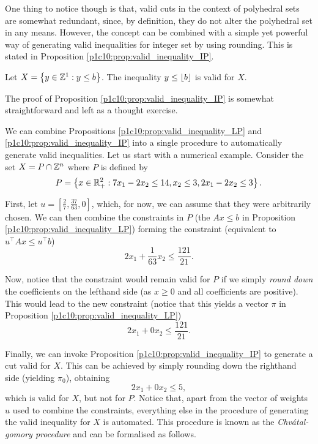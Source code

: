 One thing to notice though is that, valid cuts in the context of polyhedral sets are somewhat redundant, since, by definition, they do not alter the polyhedral set in any means. However, the concept can be combined with a simple yet powerful way of generating valid inequalities for integer set by using rounding. This is stated in Proposition \ref{p1c10:prop:valid_inequality_IP}. 
%
\begin{proposition} \label{p1c10:prop:valid_inequality_IP}
	Let $X = \left\{ y \in \mathbb{Z}^1 : y \leq b \right \}$. The inequality $y \leq \lfloor b \rfloor$ is valid for $X$.
\end{proposition}
%
The proof of Proposition \ref{p1c10:prop:valid_inequality_IP} is somewhat straightforward and left as a thought exercise. 

We can combine Propositions \ref{p1c10:prop:valid_inequality_LP} and \ref{p1c10:prop:valid_inequality_IP} into a single procedure to automatically generate valid inequalities. Let us start with a numerical example. Consider the set $X = P \cap \mathbb{Z}^n$ where $P$ is defined by
	\begin{equation*}
		P = \left\{ x \in \mathbb{R}^2_+ : 7x_1 -2x_2 \leq 14, x_2 \leq 3, 2x_1 - 2x_2 \leq 3 \right \}.
	\end{equation*}
	
First, let $u=\left[\frac{2}{7}, \frac{37}{63}, 0\right]$, which, for now, we can assume that they were arbitrarily chosen. We can then combine the constraints in $P$ (the $Ax \le b$ in Proposition \ref{p1c10:prop:valid_inequality_LP}) forming the constraint (equivalent to $u^\top Ax \le u^\top b$)
	\begin{equation*}
		2x_1 + \frac{1}{63}x_2 \leq \frac{121}{21}.
	\end{equation*}
	
Now, notice that the constraint would remain valid for $P$ if we simply \emph{round down} the coefficients on the lefthand side (as $x \ge 0$ and all coefficients are positive). This would lead to the new constraint (notice that this yields a vector $\pi$ in Proposition \ref{p1c10:prop:valid_inequality_LP})
	\begin{equation*}
		2x_1 + 0x_2 \leq \frac{121}{21}.
	\end{equation*}
	
Finally, we can invoke Proposition \ref{p1c10:prop:valid_inequality_IP} to generate a cut valid for $X$. This can be achieved by simply rounding down the righthand side (yielding $\pi_0$), obtaining
	\begin{equation*}
		2x_1 + 0x_2 \leq 5,
	\end{equation*}
	which is valid for $X$, but not for $P$. Notice that, apart from the vector of weights $u$ used to combine the constraints, everything else in the procedure of generating the valid inequality for $X$ is automated. This procedure is known as the \emph{Chv\'atal-gomory procedure} and can be formalised as follows.
	
